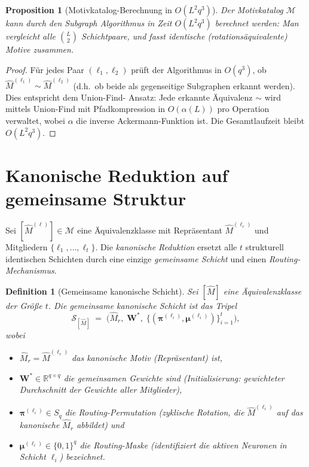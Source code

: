 \documentclass[12pt, a4paper, openany]{report}
\newtheorem{proposition}[theorem]{Proposition}
\newtheorem{definition}[theorem]{Definition}
\newcommand{\R}{\mathbb{R}}
\newcommand{\calM}{\mathcal{M}}
\newcommand{\calS}{\mathcal{S}}
\begin{document}
\begin{proposition}[Motivkatalog-Berechnung in $O(L^2 q^3)$]
\label{prop:catalog_complexity}
Der Motivkatalog $\calM$ kann durch den Subgraph Algorithmus in Zeit
$O(L^2 q^3)$ berechnet werden: Man vergleicht alle $\binom{L}{2}$
Schichtpaare, und fasst identische (rotationsäquivalente) Motive zusammen.
\end{proposition}

\begin{proof}
Für jedes Paar $(\ell_1, \ell_2)$ prüft der Algorithmus in $O(q^3)$,
ob $\hat{M}^{(\ell_1)} \sim \hat{M}^{(\ell_2)}$ (d.h.\ ob beide als
gegenseitige Subgraphen erkannt werden).  Dies entspricht dem Union-Find-
Ansatz: Jede erkannte Äquivalenz $\sim$ wird mittels Union-Find mit Pfadkompression
in $O(\alpha(L))$ pro Operation verwaltet, wobei $\alpha$ die inverse
Ackermann-Funktion ist.  Die Gesamtlaufzeit bleibt $O(L^2 q^3)$.
\end{proof}

\section{Kanonische Reduktion auf gemeinsame Struktur}
\label{sec:sgkr_reduction}

Sei $[\hat{M}^{(\ell)}] \in \calM$ eine Äquivalenzklasse mit Repräsentant
$\hat{M}^{(\ell_r)}$ und Mitgliedern $\{\ell_1, \ldots, \ell_t\}$.
Die \emph{kanonische Reduktion} ersetzt alle $t$ strukturell identischen
Schichten durch eine einzige \emph{gemeinsame Schicht} und einen
\emph{Routing-Mechanismus}.

\begin{definition}[Gemeinsame kanonische Schicht]
\label{def:shared_layer}
Sei $[\hat{M}]$ eine Äquivalenzklasse der Größe $t$.  Die \emph{gemeinsame
kanonische Schicht} ist das Tripel
\[
  \calS_{[\hat{M}]}
  \;=\;
  \bigl(
    \hat{M}_r,\;
    \bm{W}^*,\;
    \bigl\{(\bm{\pi}^{(\ell_i)}, \bm{\mu}^{(\ell_i)})\bigr\}_{i=1}^{t}
  \bigr),
\]
wobei
\begin{itemize}
  \item $\hat{M}_r = \hat{M}^{(\ell_r)}$ das kanonische Motiv
    (Repräsentant) ist,
  \item $\bm{W}^* \in \R^{q \times q}$ die \emph{gemeinsamen Gewichte} sind
    (Initialisierung: gewichteter Durchschnitt der Gewichte aller Mitglieder),
  \item $\bm{\pi}^{(\ell_i)} \in S_q$ die \emph{Routing-Permutation}
    (zyklische Rotation, die $\hat{M}^{(\ell_i)}$ auf das kanonische $\hat{M}_r$
    abbildet) und
  \item $\bm{\mu}^{(\ell_i)} \in \{0,1\}^q$ die
    \emph{Routing-Maske} (identifiziert die aktiven Neuronen in Schicht $\ell_i$)
    bezeichnet.
\end{itemize}
\end{definition}
\end{document}
